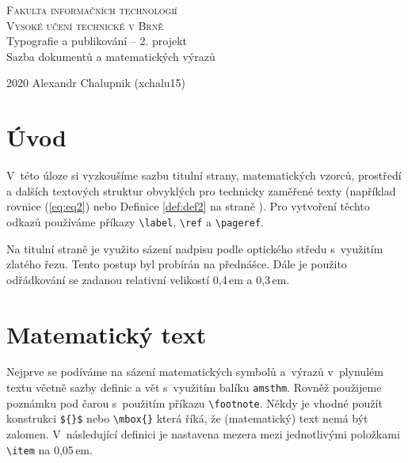 \documentclass[11pt, a4paper,twocolumn]{article}
\begin{document}
\begin{titlepage}
    \begin{center}
        \Huge
        \textsc{Fakulta informačních technologií}\\
        \textsc{Vysoké učení technické v Brně}\\
        \LARGE{Typografie a publikování -- 2. projekt\\[0.4em]
        Sazba dokumentů a matematických výrazů}\\[0.3em]
    \end{center}
    {\Large 2020 \hfill Alexandr Chalupnik (xchalu15)}
\end{titlepage}

\section*{Úvod} 
V~této úloze si vyzkoušíme sazbu titulní strany, matematických vzorců, prostředí a dalších textových struktur obvyklých pro technicky zaměřené texty (například rovnice (\ref{eq:eq2}) nebo Definice \ref{def:def2} na straně \pageref{eq:eq1}). Pro vytvoření těchto odkazů používáme příkazy \verb|\label|, \verb|\ref| a \verb|\pageref|. 

Na titulní straně je využito sázení nadpisu podle optického středu s~využitím zlatého řezu. Tento postup byl probírán na přednášce. Dále je použito odřádkování se zadanou relativní velikostí 0{,}4\,em a 0{,}3\,em.

\section{Matematický text}
Nejprve se podíváme na sázení matematických symbolů a~výrazů v~plynulém textu včetně sazby definic a vět s~využitím balíku \verb|amsthm|. Rovněž použijeme poznámku pod čarou s~použitím příkazu \verb|\footnote|. Někdy je vhodné použít konstrukci \verb|${}$| nebo \verb|\mbox{}| která říká, že (matematický) text nemá být zalomen. V~následující definici je nastavena mezera mezi jednotlivými položkami \verb|\item| na 0,05\,em.
\end{document}
